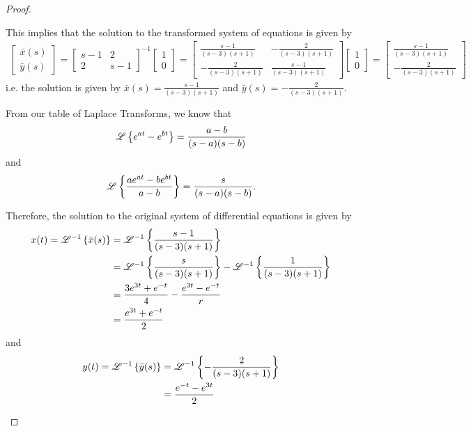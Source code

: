 \begin{proof}
\begin{enumerate}
      This implies that the solution to the transformed system of equations is given by
      \begin{align*}
        \begin{bmatrix}
          \bar{x}(s) \\
          \bar{y}(s)
        \end{bmatrix}
        =
        \begin{bmatrix}
          s-1 & 2 \\
          2 & s-1
        \end{bmatrix}
        ^{-1}
        \begin{bmatrix}
          1 \\
          0
        \end{bmatrix}
        =
        \begin{bmatrix}
          \frac{s-1}{(s-3)(s+1)} & -\frac{2}{(s-3)(s+1)} \\
          -\frac{2}{(s-3)(s+1)} & \frac{s-1}{(s-3)(s+1)}
        \end{bmatrix}
        \begin{bmatrix}
          1 \\
          0
        \end{bmatrix}
        =
        \begin{bmatrix}
          \frac{s-1}{(s-3)(s+1)} \\
          -\frac{2}{(s-3)(s+1)}
        \end{bmatrix}
      \end{align*}
      i.e. the solution is given by $\displaystyle \bar{x}(s) = \frac{s-1}{(s-3)(s+1)}$ and $\displaystyle \bar{y}(s) = -\frac{2}{(s-3)(s+1)}$.

      From our table of Laplace Transforms, we know that
      \begin{align*}
        \mathscr{L}\left\{ {e^{at} - e^{bt}} \right\} = \frac{a-b}{(s-a)(s-b)}
      \end{align*}
      and
      \begin{align*}
        \mathscr{L}\left\{ {\frac{ae^{at} - be^{bt}}{a-b}} \right\} = \frac{s}{(s-a)(s-b)}.
      \end{align*}

      Therefore, the solution to the original system of differential equations is given by
      \begin{align*}
        x(t) = \mathscr{L}^{-1}\left\{ {\bar{x}(s)} \right\} &= \mathscr{L}^{-1}\left\{ {\frac{s-1}{(s-3)(s+1)}} \right\} \\
        &= \mathscr{L}^{-1}\left\{ {\frac{s}{(s-3)(s+1)}} \right\} - \mathscr{L}^{-1}\left\{ {\frac{1}{(s-3)(s+1)}} \right\} \\
        &= \frac{3e^{3t}+e^{-t}}{4} - \frac{e^{3t} - e^{-t}}{r} \\
        &= \frac{e^{3t} + e^{-t}}{2}
      \end{align*}
      and
      \begin{align*}
        y(t) = \mathscr{L}^{-1}\left\{ {\bar{y}(s)} \right\} &= \mathscr{L}^{-1}\left\{ {-\frac{2}{(s-3)(s+1)}} \right\} \\
        &= \frac{e^{-t} - e^{3t}}{2}
      \end{align*}

  \end{enumerate}
\end{proof}
\newpage
